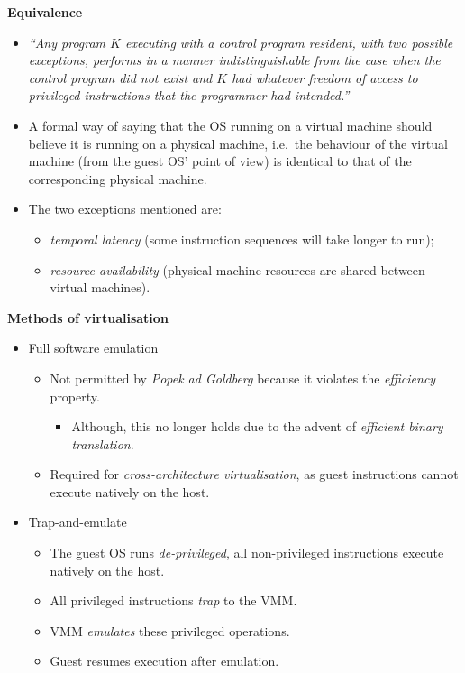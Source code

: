 \documentclass[11pt,a4paper]{article}
\begin{document}
\textbf{Equivalence}
\begin{itemize}
    \item \emph{``Any program $K$ executing with a control program resident,
            with two possible exceptions,
            performs in a manner indistinguishable from the case when the control program
            did not exist and $K$ had whatever freedom of access to privileged instructions
        that the programmer had intended.''}
    \item A formal way of saying that the OS running on a virtual machine should believe it is
        running on a physical machine, i.e.\ the behaviour of the virtual machine
        (from the guest OS' point of view) is identical to that of the corresponding physical
        machine.
    \item The two exceptions mentioned are:
        \begin{itemize}
            \item \emph{temporal latency} (some instruction sequences will take longer to run);
            \item \emph{resource availability} (physical machine resources are shared between
                virtual machines).
        \end{itemize}
\end{itemize}

\textbf{Methods of virtualisation}
\begin{itemize}
    \item Full software emulation
        \begin{itemize}
            \item Not permitted by \emph{Popek ad Goldberg} because it violates the
                \emph{efficiency} property.
                \begin{itemize}
                    \item Although, this no longer holds due to the advent of
                        \emph{efficient binary translation}.
                \end{itemize}
            \item Required for \emph{cross-architecture virtualisation}, as guest instructions
                cannot execute natively on the host.
        \end{itemize}
    \item Trap-and-emulate
        \begin{itemize}
            \item The guest OS runs \emph{de-privileged}, all non-privileged instructions
                execute natively on the host.
            \item All privileged instructions \emph{trap} to the VMM.\
            \item VMM \emph{emulates} these privileged operations.
            \item Guest resumes execution after emulation.
        \end{itemize}
\end{itemize}
\end{document}
